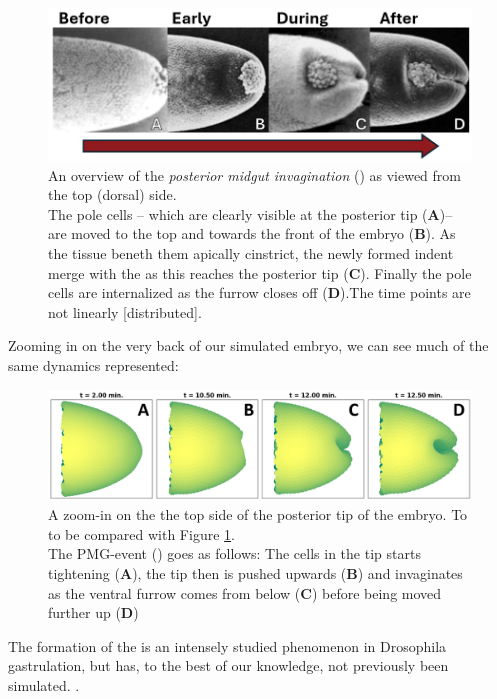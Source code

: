\begin{figure}[H]
    \centering
    \includegraphics[width=1.\linewidth]{chapters/Results/figures/4stepPMG_annotated.png}
    \caption{An overview of the \textit{posterior midgut invagination} () as viewed from the top (dorsal) side. \\The pole cells -- which are clearly visible at the posterior tip (\textbf{A})-- are moved to the top and towards the front of the embryo (\textbf{B}). As the tissue beneth them apically cinstrict, the newly formed indent merge with the  as this reaches the posterior tip (\textbf{C}). Finally the pole cells are internalized as the furrow closes off (\textbf{D}).The time points are not linearly [distributed].}
    \label{fig:PMG-IRL}
\end{figure}
Zooming in on the very back of our simulated embryo, we can see much of the same dynamics represented:
\begin{figure}[H]
    \centering
    \includegraphics[width=1.\linewidth]{chapters/Results/figures/VisualPMG.png}
    \caption{A zoom-in on the the top side of the posterior tip of the embryo. To to be compared with Figure \ref{fig:PMG-IRL}. \\The PMG-event () goes as follows: The cells in the tip starts tightening (\textbf{A}), the tip then is pushed upwards (\textbf{B}) and invaginates as the ventral furrow comes from below (\textbf{C}) before being moved further up (\textbf{D}) }
    \label{fig:visual-pmg-external}
\end{figure}

The formation of the  is an intensely studied phenomenon in Drosophila gastrulation, but has, to the best of our knowledge, not previously been simulated. .

